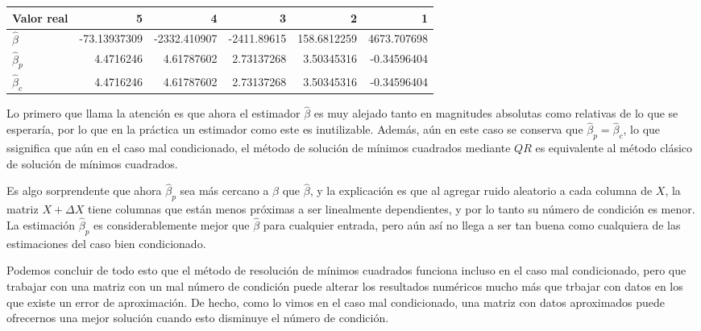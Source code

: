 \documentclass{article}
\begin{document}
\begin{enumerate}
\begin{enumerate}
        \begin{center}
            \begin{tabular}{@{}lrrrrr@{}}
                \toprule
                Valor real & 5 & 4 & 3 & 2 & 1 \\ \midrule
                $\hat\beta$ & -73.13937309 & -2332.410907 & -2411.89615 & 158.6812259 & 4673.707698 \\
                $\hat\beta_p$ & 4.4716246 & 4.61787602 & 2.73137268 & 3.50345316 & -0.34596404 \\
                $\hat\beta_c$ & 4.4716246 & 4.61787602 & 2.73137268 & 3.50345316 & -0.34596404 \\ \bottomrule
                \end{tabular}
        \end{center}

        Lo primero que llama la atención es que ahora el estimador $\hat\beta$ es muy alejado tanto en magnitudes absolutas como
        relativas de lo que se esperaría, por lo que en la práctica un estimador como este es inutilizable. Además, aún en 
        este caso se conserva que $\hat\beta_p = \hat\beta_c$, lo que ssignifica que aún en el caso mal condicionado, el método
        de solución de mínimos cuadrados mediante $QR$ es equivalente al método clásico de solución de mínimos cuadrados.

        Es algo sorprendente que ahora $\hat\beta_p$ sea más cercano a $\beta$ que $\hat\beta$, y la explicación es que
        al agregar ruido aleatorio a cada columna de $X$, la matriz $X + \Delta X$ tiene columnas que están menos
        próximas a ser linealmente dependientes, y por lo tanto su número de condición es menor. La estimación $\hat\beta_p$
        es considerablemente mejor que $\hat\beta$ para cualquier entrada, pero aún así no llega a ser tan buena como cualquiera
        de las estimaciones del caso bien condicionado.

        Podemos concluir de todo esto que el método de resolución de mínimos cuadrados funciona incluso en el caso mal condicionado,
        pero que trabajar con una matriz con un mal número de condición puede alterar los resultados numéricos mucho más que trbajar 
        con datos en los que existe un error de aproximación. De hecho, como lo vimos en el caso mal condicionado, una matriz con datos
        aproximados puede ofrecernos una mejor solución cuando esto disminuye el número de condición.

    \end{enumerate}



   
\end{enumerate}




 
\end{document}
